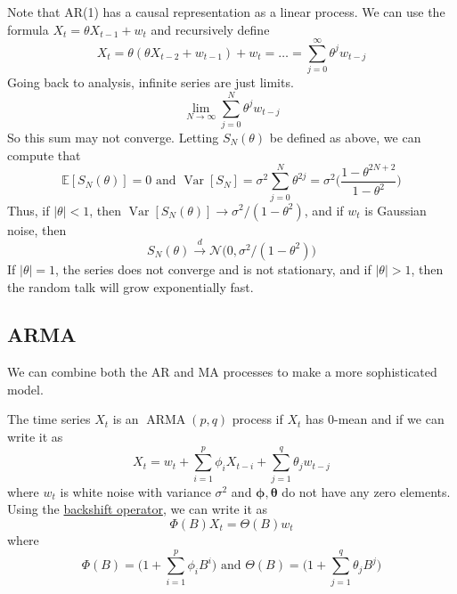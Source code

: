 \documentclass{article}
\DeclareMathOperator{\ARMA}{ARMA}
\DeclareMathOperator{\Var}{Var}
\begin{document}
  \begin{example}
    \label{ex:ar-1-as-a-linear-process}
    Note that AR(1) has a causal representation as a linear process. We can use the formula $X_t = \theta X_{t-1} + w_t$ and recursively define 
    \begin{equation}
      X_t = \theta(\theta X_{t-2} + w_{t-1}) + w_t = \ldots = \sum_{j=0}^\infty \theta^j w_{t-j}
    \end{equation}
    Going back to analysis, infinite series are just limits. 
    \begin{equation}
      \lim_{N \rightarrow \infty} \sum_{j=0}^N \theta^j w_{t-j} 
    \end{equation}
    So this sum may not converge. Letting $S_N (\theta)$ be defined as above, we can compute that 
    \begin{equation}
      \mathbb{E}[ S_N (\theta)] = 0 \text{ and } \Var[S_N] = \sigma^2 \sum_{j=0}^N \theta^{2j} = \sigma^2 \bigg( \frac{1 - \theta^{2N + 2}}{1 - \theta^2}\bigg)
    \end{equation}
    Thus, if $|\theta| < 1$, then $\Var[S_N (\theta)] \rightarrow \sigma^2 / (1 - \theta^2)$, and if $w_t$ is Gaussian noise, then 
    \begin{equation}
      S_N (\theta) \xrightarrow{d} \mathcal{N} \big( 0, \sigma^2 / (1 - \theta^2) \big)
    \end{equation}
    If $|\theta| = 1$, the series does not converge and is not stationary, and if $|\theta| > 1$, then the random talk will grow exponentially fast. 
  \end{example}

\subsection{ARMA}

  We can combine both the AR and MA processes to make a more sophisticated model. 

  \begin{definition}[ARMA]
    \label{def:arma}
    The time series $X_t$ is an $\ARMA(p, q)$ process if $X_t$ has $0$-mean and if we can write it as 
    \begin{equation}
      X_t = w_t + \sum_{i=1}^p \phi_i X_{t-i} + \sum_{j=1}^q \theta_j w_{t-j}
    \end{equation}
    where $w_t$ is white noise with variance $\sigma^2$ and $\boldsymbol{\phi}, \boldsymbol{\theta}$ do not have any zero elements. Using the \hyperref[def:backshift-operator]{backshift operator}, we can write it as 
    \begin{equation}
      \Phi(B) X_t = \Theta(B) w_t
    \end{equation}
    where 
    \begin{equation}
      \Phi(B) = \bigg( 1 + \sum_{i=1}^p \phi_i B^i \bigg) \text{ and } \Theta(B) = \bigg( 1 + \sum_{j=1}^q \theta_j B^j \bigg)
    \end{equation}
  \end{definition}
\end{document}
